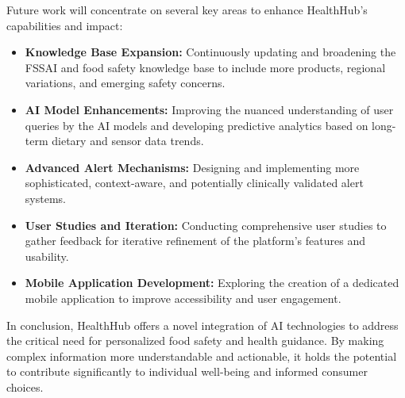 Future work will concentrate on several key areas to enhance HealthHub's capabilities and impact:
\begin{itemize}
    \item \textbf{Knowledge Base Expansion:} Continuously updating and broadening the FSSAI and food safety knowledge base to include more products, regional variations, and emerging safety concerns.
    \item \textbf{AI Model Enhancements:} Improving the nuanced understanding of user queries by the AI models and developing predictive analytics based on long-term dietary and sensor data trends.
    \item \textbf{Advanced Alert Mechanisms:} Designing and implementing more sophisticated, context-aware, and potentially clinically validated alert systems.
    \item \textbf{User Studies and Iteration:} Conducting comprehensive user studies to gather feedback for iterative refinement of the platform's features and usability.
    \item \textbf{Mobile Application Development:} Exploring the creation of a dedicated mobile application to improve accessibility and user engagement.
\end{itemize}

In conclusion, HealthHub offers a novel integration of AI technologies to address the critical need for personalized food safety and health guidance. By making complex information more understandable and actionable, it holds the potential to contribute significantly to individual well-being and informed consumer choices. 